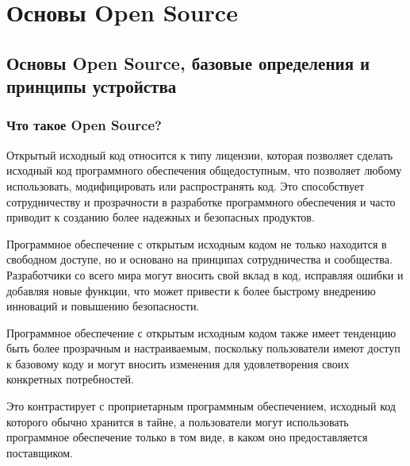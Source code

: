 \documentclass[letterpaper,10pt,russian]{sphinxmanual}
\begin{document}
\chapter{Основы Open Source}
\label{\detokenize{index:open-source}}
\sphinxstepscope


\section{Основы Open Source, базовые определения и принципы устройства}
\label{\detokenize{educational_materials/open_source/content:open-source}}\label{\detokenize{educational_materials/open_source/content::doc}}

\subsection{Что такое Open Source?}
\label{\detokenize{educational_materials/open_source/content:id1}}
\sphinxAtStartPar
Открытый исходный код относится к типу лицензии, которая позволяет сделать исходный код программного обеспечения общедоступным, что позволяет любому использовать, модифицировать или распространять код. Это способствует сотрудничеству и прозрачности в разработке программного обеспечения и часто приводит к созданию более надежных и безопасных продуктов.

\sphinxAtStartPar
Программное обеспечение с открытым исходным кодом не только находится в свободном доступе, но и основано на принципах сотрудничества и сообщества. Разработчики со всего мира могут вносить свой вклад в код, исправляя ошибки и добавляя новые функции, что может привести к более быстрому внедрению инноваций и повышению безопасности.

\sphinxAtStartPar
Программное обеспечение с открытым исходным кодом также имеет тенденцию быть более прозрачным и настраиваемым, поскольку пользователи имеют доступ к базовому коду и могут вносить изменения для удовлетворения своих конкретных потребностей.

\sphinxAtStartPar
Это контрастирует с проприетарным программным обеспечением, исходный код которого обычно хранится в тайне, а пользователи могут использовать программное обеспечение только в том виде, в каком оно предоставляется поставщиком.
\end{document}
